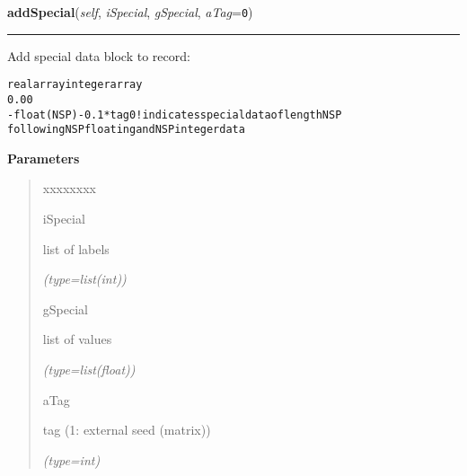 \hspace{.8\funcindent}\begin{boxedminipage}{\funcwidth}

    \raggedright \textbf{addSpecial}(\textit{self}, \textit{iSpecial}, \textit{gSpecial}, \textit{aTag}={\tt 0})

    \vspace{-1.5ex}

    \rule{\textwidth}{0.5\fboxrule}
\setlength{\parskip}{2ex}
    Add special data block to record:

\begin{alltt}
    real array              integer array    
    0.0                     0    
    -float(NSP)-0.1*tag     0   ! indicates special data of length NSP
    following NSP floating and NSP integer data\end{alltt}

\setlength{\parskip}{1ex}
      \textbf{Parameters}
      \vspace{-1ex}

      \begin{quote}
        \begin{Ventry}{xxxxxxxx}

          \item[iSpecial]

          list of labels

            {\it (type=list(int))}

          \item[gSpecial]

          list of values

            {\it (type=list(float))}

          \item[aTag]

          tag (1: external seed (matrix))

            {\it (type=int)}

        \end{Ventry}

      \end{quote}

    \end{boxedminipage}

    \label{mille:MilleRecord:getSpecial}

    \vspace{0.5ex}

